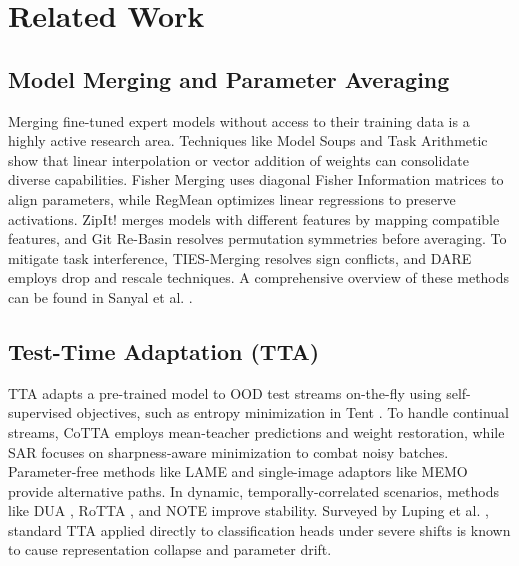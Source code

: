 \documentclass{article}
\theoremstyle{plain}
\theoremstyle{definition}
\theoremstyle{remark}
\begin{document}
\section{Related Work}
\label{sec:related}

\subsection{Model Merging and Parameter Averaging}
Merging fine-tuned expert models without access to their training data is a highly active research area. Techniques like Model Soups \cite{wortsman2022model} and Task Arithmetic \cite{ilharco2022editing} show that linear interpolation or vector addition of weights can consolidate diverse capabilities. Fisher Merging \cite{matena2022fisher} uses diagonal Fisher Information matrices to align parameters, while RegMean \cite{jin2023regmean} optimizes linear regressions to preserve activations. ZipIt! \cite{stoica2023zipit} merges models with different features by mapping compatible features, and Git Re-Basin \cite{ainsworth2022git} resolves permutation symmetries before averaging. To mitigate task interference, TIES-Merging \cite{yadav2023ties} resolves sign conflicts, and DARE \cite{yu2023dare} employs drop and rescale techniques. A comprehensive overview of these methods can be found in Sanyal et al. \cite{sanyal2023model}.

\subsection{Test-Time Adaptation (TTA)}
TTA adapts a pre-trained model to OOD test streams on-the-fly using self-supervised objectives, such as entropy minimization in Tent \cite{wang2021tent}. To handle continual streams, CoTTA \cite{wang2022cotta} employs mean-teacher predictions and weight restoration, while SAR \cite{niu2023sar} focuses on sharpness-aware minimization to combat noisy batches. Parameter-free methods like LAME \cite{boudiaf2022lame} and single-image adaptors like MEMO \cite{zhang2022memo} provide alternative paths. In dynamic, temporally-correlated scenarios, methods like DUA \cite{mirza2022dua}, RoTTA \cite{wind2023rotta}, and NOTE \cite{gong2022note} improve stability. Surveyed by Luping et al. \cite{luping2024tta}, standard TTA applied directly to classification heads under severe shifts is known to cause representation collapse and parameter drift.
\end{document}

